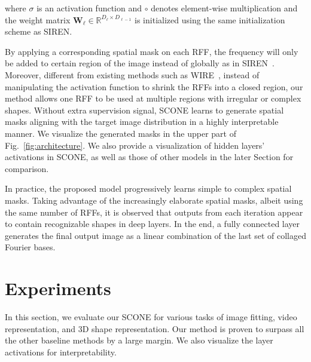 \documentclass[letterpaper]{article} %
\newcommand{\mat}[1]{\bm{#1}}
\begin{document}

\noindent where $\sigma$ is an activation function and $\circ$ denotes element-wise multiplication and the weight matrix $\mat{W}_{\ell}\in\mathbb{R}^{D_{\ell}\times D_{\ell-1}}$ is initialized using the same initialization scheme as SIREN. 


By applying a corresponding spatial mask on each RFF, the frequency will only be added to certain region of the image instead of globally as in SIREN~\cite{2020siren}. Moreover, different from existing methods such as WIRE~\cite{saragadam2023wire}, instead of manipulating the activation function to shrink the RFFs into a closed region, our method allows one RFF to be used at multiple regions with irregular or complex shapes. Without extra supervision signal, SCONE learns to generate spatial masks aligning with the target image distribution in a highly interpretable manner. We visualize the generated masks in the upper part of Fig.~\ref{fig:architecture}. We also provide a visualization of hidden layers' activations in SCONE, as well as those of other models in the later Section for comparison.

In practice, the proposed model progressively learns simple to complex spatial masks. Taking advantage of the increasingly elaborate spatial masks, albeit using the same number of RFFs, it is observed that outputs from each iteration appear to contain recognizable shapes in deep layers. In the end, a fully connected layer generates the final output image as a linear combination of the last set of collaged Fourier bases.

\section{Experiments}
In this section, we evaluate our SCONE for various tasks of image fitting, video representation, and 3D shape representation. Our method is proven to surpass all the other baseline methods by a large margin. We also visualize the layer activations for interpretability.
\end{document}
